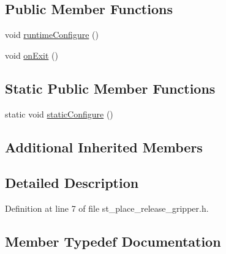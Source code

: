 \subsection*{Public Member Functions}
\begin{DoxyCompactItemize}
\item 
void \hyperlink{structsm__fetch__two__table__whiskey__pour_1_1StReleaseGripper_a821a4d8ec2dfbf7add10736fb74b906f}{runtime\+Configure} ()
\item 
void \hyperlink{structsm__fetch__two__table__whiskey__pour_1_1StReleaseGripper_a13518e506b99cccf1b0bc1b892986712}{on\+Exit} ()
\end{DoxyCompactItemize}
\subsection*{Static Public Member Functions}
\begin{DoxyCompactItemize}
\item 
static void \hyperlink{structsm__fetch__two__table__whiskey__pour_1_1StReleaseGripper_a2b756c1a3170c3f2e81225f18ba89406}{static\+Configure} ()
\end{DoxyCompactItemize}
\subsection*{Additional Inherited Members}


\subsection{Detailed Description}


Definition at line 7 of file st\+\_\+place\+\_\+release\+\_\+gripper.\+h.



\subsection{Member Typedef Documentation}
\mbox{\label{structsm__fetch__two__table__whiskey__pour_1_1StReleaseGripper_aded50b4d3420ac565f015cb60e6aac43}} 
